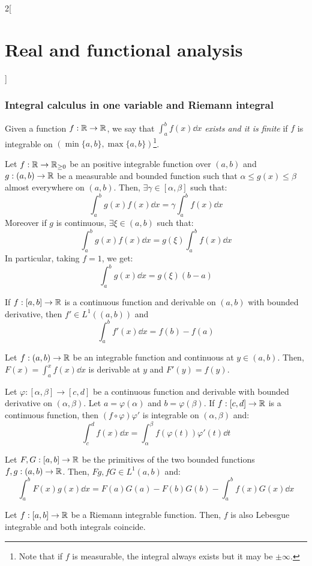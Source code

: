 \documentclass[../../../main_math.tex]{subfiles}
\begin{document}
\begin{multicols}{2}[\section{Real and functional analysis}]
  \subsubsection{Integral calculus in one variable and Riemann integral}
  \begin{definition}
    Given a function $f:\mathbb{R}\rightarrow\mathbb{R}$, we say that $\int_a^bf(x)\dd{x}$ \emph{exists and it is finite} if $f$ is integrable on $(\min\{a,b\},\max\{a,b\})$\footnote{Note that if $f$ is measurable, the integral always exists but it may be $\pm\infty$.}.
  \end{definition}
  \begin{theorem}
    Let $f:\mathbb{R}\rightarrow\mathbb{R}_{\geq 0}$ be an positive integrable function over $(a,b)$ and $g:(a,b)\rightarrow\mathbb{R}$ be a measurable and bounded function such that $\alpha\leq g(x)\leq\beta$ almost everywhere on $(a,b)$. Then, $\exists\gamma\in[\alpha,\beta]$ such that: $$\int_a^bg(x)f(x)\dd{x}=\gamma\int_a^bf(x)\dd{x}$$
    Moreover if $g$ is continuous, $\exists\xi\in(a,b)$ such that: $$\int_a^bg(x)f(x)\dd{x}=g(\xi)\int_a^bf(x)\dd{x}$$
    In particular, taking $f=1$, we get:  $$\int_a^bg(x)\dd{x}=g(\xi)(b-a)$$
  \end{theorem}
  \begin{theorem}
    If $f:[a,b]\rightarrow\mathbb{R}$ is a continuous function and derivable on $(a,b)$ with bounded derivative, then $f'\in L^1((a,b))$ and $$\int_a^bf'(x)\dd{x}=f(b)-f(a)$$
  \end{theorem}
  \begin{theorem}
    Let $f:(a,b)\rightarrow\mathbb{R}$ be an integrable function and continuous at $y\in (a,b)$. Then, $F(x)=\int_a^xf(x)\dd{x}$ is derivable at $y$ and $F'(y)=f(y)$.
  \end{theorem}
  \begin{theorem}
    Let $\varphi:[\alpha,\beta]\rightarrow[c,d]$ be a continuous function and derivable with bounded derivative on $(\alpha,\beta)$. Let $a=\varphi(\alpha)$ and $b=\varphi(\beta)$. If $f:[c,d]\rightarrow\mathbb{R}$ is a continuous function, then $(f\circ\varphi)\varphi'$ is integrable on $(\alpha,\beta)$ and: $$\int_c^df(x)\dd{x}=\int_\alpha^\beta f(\varphi(t))\varphi'(t)\dd{t}$$
  \end{theorem}
  \begin{theorem}
    Let $F,G:[a,b]\rightarrow\mathbb{R}$ be the primitives of the two bounded functions $f,g:(a,b)\rightarrow\mathbb{R}$. Then, $Fg,fG\in L^1(a,b)$ and: $$\int_a^bF(x)g(x)\dd{x}=F(a)G(a)-F(b)G(b)-\int_a^bf(x)G(x)\dd{x}$$
  \end{theorem}
  \begin{theorem}
    Let $f:[a,b]\rightarrow\mathbb{R}$ be a Riemann integrable function. Then, $f$ is also Lebesgue integrable and both integrals coincide.
  \end{theorem}

\end{multicols}
\end{document}
